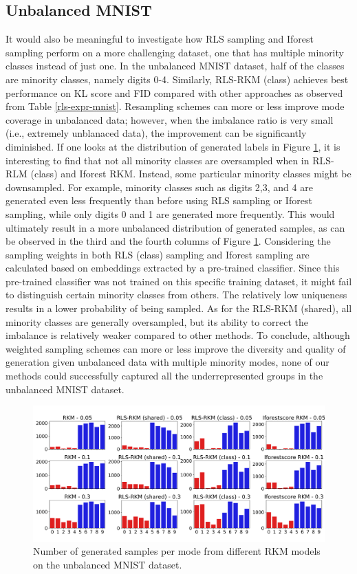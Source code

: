 \subsection{Unbalanced MNIST}
\label{subsec-expr-ubMNIST}
It would also be meaningful to investigate how RLS sampling and Iforest sampling perform on a more challenging dataset, one that has multiple minority classes instead of just one. In the unbalanced MNIST dataset, half of the classes are minority classes, namely digits 0-4. Similarly, RLS-RKM (class) achieves best performance on KL score and FID compared with other approaches as observed from Table \ref{rls-expr-mnist}. Resampling schemes can more or less improve mode coverage in unbalanced data; however, when the imbalance ratio is very small (i.e., extremely unblanaced data), the improvement can be significantly diminished. If one looks at the distribution of generated labels in Figure \ref{fig-rls-gen-dist-ubmnist}, it is interesting to find that not all minority classes are oversampled when in RLS-RLM (class) and Iforest RKM. Instead, some particular minority classes might be downsampled. For example, minority classes such as digits 2,3, and 4 are generated even less frequently than before using RLS sampling or Iforest sampling, while only digits 0 and 1 are generated more frequently. This would ultimately result in a more unbalanced distribution of generated samples, as can be observed in the third and the fourth columns of Figure \ref{fig-rls-gen-dist-ubmnist}. Considering the sampling weights in both RLS (class) sampling and Iforest sampling are calculated based on embeddings extracted by a pre-trained classifier. Since this pre-trained classifier was not trained on this specific training dataset, it might fail to distinguish certain minority classes from others. The relatively low uniqueness results in a lower probability of being sampled. As for the RLS-RKM (shared), all minority classes are generally oversampled, but its ability to correct the imbalance is relatively weaker compared to other methods. To conclude, although weighted sampling schemes can more or less improve the diversity and quality of generation given unbalanced data with multiple minority modes, none of our methods could successfully captured all the underrepresented groups in the unbalanced MNIST dataset.

\begin{figure}[ht]
    \centering
    \includegraphics[width=0.9\linewidth]{Figures/Methods/expr-rls-mnist-gen-dist.png}
    \caption{Number of generated samples per mode from different RKM models on the unbalanced MNIST dataset.}
    \label{fig-rls-gen-dist-ubmnist}
\end{figure}


